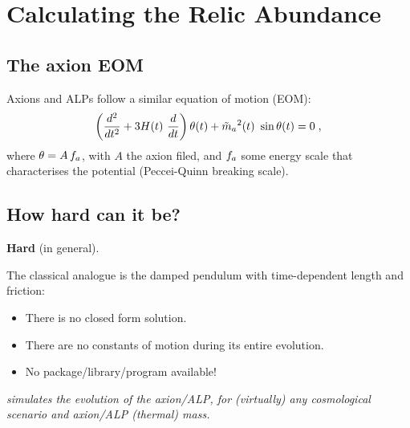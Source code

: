 \documentclass[10pt,utf8,compress,xcolor=dvipsnames]{beamer}
\begin{document}
\section{Calculating the Relic Abundance}
\subsection{The axion EOM}
\begin{frame}{\insertsubsectionhead}
	Axions and ALPs follow a similar equation of motion (EOM):
	\begin{equation*}
		\left( \dfrac{d^2}{d t^2} + 3 H(t) \ \dfrac{d}{d t}  \right) \theta(t) + \tilde m_{a}{}^2(t) \ \sin \theta(t) = 0 \; ,
	\end{equation*}	
	where $\theta= A \, f_{a}{}$, with $A$ the axion filed, and $f_{a}{}$ some energy scale that characterises the potential (Peccei-Quinn breaking scale).
	
	
\end{frame}

\subsection{How hard can it be?}
\begin{frame}{\insertsubsectionhead}
	\begin{center}
		\textbf{Hard} (in general).\\[1cm]
	\end{center}	
	
	The classical analogue is the damped pendulum with time-dependent length and friction:
	\begin{itemize}
		\item There is no closed form solution.
		\item There are no constants of motion during its entire evolution.
		\item No package/library/program available!\pause\\[1cm]
	\end{itemize}
	
	\begin{center}
		{\sl \mimes simulates the evolution of the axion/ALP, for (virtually) any cosmological scenario and axion/ALP (thermal) mass.}
	\end{center}		
\end{frame}
\end{document}

